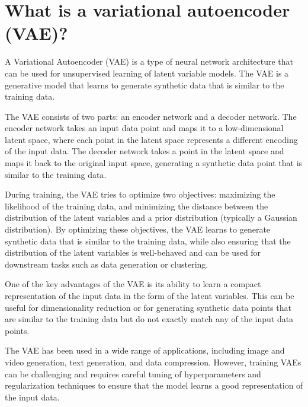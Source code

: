\section{What is a variational autoencoder (VAE)?}
A Variational Autoencoder (VAE) is a type of neural network architecture that can be used for unsupervised learning of latent variable models. The VAE is a generative model that learns to generate synthetic data that is similar to the training data.

The VAE consists of two parts: an encoder network and a decoder network. The encoder network takes an input data point and maps it to a low-dimensional latent space, where each point in the latent space represents a different encoding of the input data. The decoder network takes a point in the latent space and maps it back to the original input space, generating a synthetic data point that is similar to the training data.

During training, the VAE tries to optimize two objectives: maximizing the likelihood of the training data, and minimizing the distance between the distribution of the latent variables and a prior distribution (typically a Gaussian distribution). By optimizing these objectives, the VAE learns to generate synthetic data that is similar to the training data, while also ensuring that the distribution of the latent variables is well-behaved and can be used for downstream tasks such as data generation or clustering.

One of the key advantages of the VAE is its ability to learn a compact representation of the input data in the form of the latent variables. This can be useful for dimensionality reduction or for generating synthetic data points that are similar to the training data but do not exactly match any of the input data points.

The VAE has been used in a wide range of applications, including image and video generation, text generation, and data compression. However, training VAEs can be challenging and requires careful tuning of hyperparameters and regularization techniques to ensure that the model learns a good representation of the input data.

